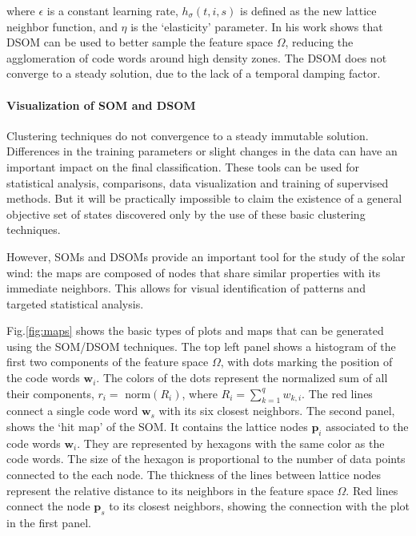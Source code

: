 where $\epsilon$ is a constant learning rate, $h_\sigma(t,i,s)$ is defined as the new lattice neighbor function, and $\eta$ is the `elasticity' parameter. In his work \citep{Rougier2011} shows that DSOM can be used to better sample the feature space $\Omega$, reducing the agglomeration of code words around high density zones. The DSOM does not converge to a steady solution, due to the lack of a temporal damping factor.

\paragraph{Visualization of SOM and DSOM}
Clustering techniques do not convergence to a steady immutable solution. Differences in the training parameters or slight changes in the data can have an important impact on the final classification. These tools can be used for statistical analysis, comparisons, data visualization and training of supervised methods. But it will be practically impossible to claim the existence of a general objective set of states discovered only by the use of these basic clustering techniques.

However, SOMs and DSOMs provide an important tool for the study of the solar wind: the maps are composed of nodes that share similar properties with its immediate neighbors. This allows for visual identification of patterns and targeted statistical analysis.

Fig.\ref{fig:maps} shows the basic types of plots and maps that can be generated using the SOM/DSOM techniques. The top left panel shows a histogram of the first two components of the feature space $\Omega$, with dots marking the position of the code words $\boldsymbol{w}_i$. The colors of the dots represent the normalized sum of all their components, $r_i =$ norm$(R_i)$, where $R_i = \sum_{k=1}^q w_{k,i}$. The red lines connect a single code word $\boldsymbol{w}_s$ with its six closest neighbors. The second panel, shows the `hit map' of the SOM. It contains the lattice nodes $\boldsymbol{p}_i$ associated to the code words $\boldsymbol{w}_i$. They are represented by hexagons with the same color as the code words. The size of the hexagon is proportional to the number of data points connected to the each node. The thickness of the lines between lattice nodes represent the relative distance to its neighbors in the feature space $\Omega$. Red lines connect the node $\boldsymbol{p}_s$ to its closest neighbors, showing the connection with the plot in the first panel.

